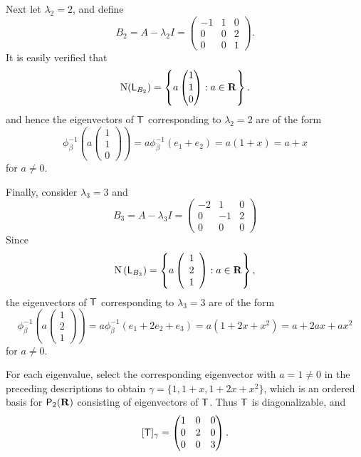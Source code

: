\begin{example}
Next let \(\lambda_2 = 2\), and define
\[
    B_{2}=A-\lambda_{2} I=\left(\begin{array}{lll}
        -1 & 1 & 0 \\
        0 & 0 & 2 \\
        0 & 0 & 1
    \end{array}\right).
\]
It is easily verified that
\[
    \mathrm{N}(\textsf{L}_{B_2}) = \left\{ a \begin{pmatrix} 1 \\ 1 \\ 0 \end{pmatrix} : a \in \mathbf{R} \right\}.
\]
and hence the eigenvectors of \(\textsf{T}\) corresponding to \(\lambda_2 = 2\) are of the form
\[
    \phi_{\beta}^{-1} \left( a \begin{pmatrix} 1 \\ 1 \\ 0 \end{pmatrix} \right) = a \phi_{\beta}^{-1} (e_1 + e_2) = a (1 + x) = a + x
\]
for \(a \ne 0\).

Finally, consider \(\lambda_{3} = 3\) and
\[
    B_{3}=A-\lambda_{3} I=\left(\begin{array}{rrr}
        -2 & 1 & 0 \\
        0 & -1 & 2 \\
        0 & 0 & 0
    \end{array}\right)
\]
Since
\[
    \mathrm{N}\left(\textsf{L}_{B_{3}}\right) = \left\{ a\left(\begin{array}{l} 1 \\ 2 \\ 1 \end{array}\right): a \in \mathbf{R} \right\},
\]
the eigenvectors of \(\textsf{T}\) corresponding to \(\lambda_{3}=3\) are of the form
\[
    \phi_{\beta}^{-1}\left(a\left(\begin{array}{l} 1 \\ 2 \\ 1 \end{array}\right)\right)
    = a \phi_{\beta}^{-1}\left(e_{1}+2 e_{2}+e_{3}\right)
    = a \left(1+2 x+x^{2}\right) = a + 2ax + ax^2
\]
for \(a \ne 0\).

For each eigenvalue, select the corresponding eigenvector with \(a = 1 \ne 0\) in the preceding descriptions to obtain \(\gamma = \{ 1, 1 + x, 1 + 2x + x^2 \}\), which is an ordered
basis for \(\textsf{P}_2(\mathbf{R})\) consisting of eigenvectors of \(\textsf{T}\).
Thus \(\textsf{T}\) is diagonalizable, and
\[
    [\textsf{T}]_{\gamma} = \begin{pmatrix} 1 & 0 & 0 \\ 0 & 2 & 0 \\ 0 & 0 & 3 \end{pmatrix}.
\]
\end{example}

